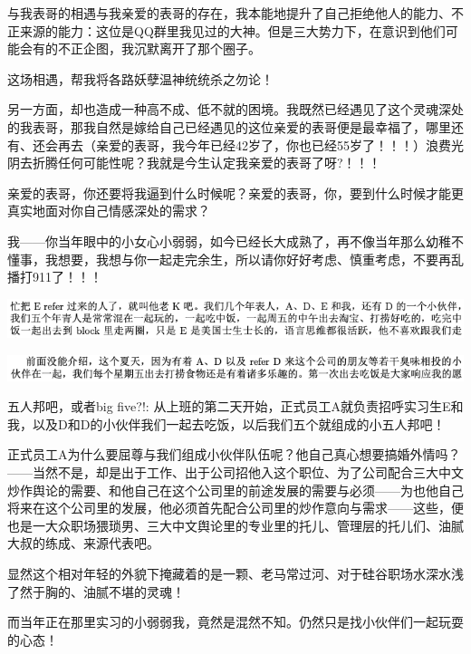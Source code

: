 \documentclass[9pt, b5paper]{article}
\begin{document}
与我表哥的相遇与我亲爱的表哥的存在，我本能地提升了自己拒绝他人的能力、不正来源的能力：这位是QQ群里我见过的大神。但是三大势力下，在意识到他们可能会有的不正企图，我沉默离开了那个圈子。 

这场相遇，帮我将各路妖孽温神统统杀之勿论！

另一方面，却也造成一种高不成、低不就的困境。我既然已经遇见了这个灵魂深处的我表哥，那我自然是嫁给自己已经遇见的这位亲爱的表哥便是最幸福了，哪里还有、还会再去（亲爱的表哥，我今年已经42岁了，你也已经55岁了！！！）浪费光阴去折腾任何可能性呢？我就是今生认定我亲爱的表哥了呀?！！！

亲爱的表哥，你还要将我逼到什么时候呢？亲爱的表哥，你，要到什么时候才能更真实地面对你自己情感深处的需求？

我——你当年眼中的小女心小弱弱，如今已经长大成熟了，再不像当年那么幼稚不懂事，我想要，我想与你一起走完余生，所以请你好好考虑、慎重考虑，不要再乱播打911了！！！

\begin{center}
\includegraphics[width=.9\linewidth]{./pic/backups_plans_20210507_212124.png}
\end{center}

\begin{center}
\includegraphics[width=.9\linewidth]{./pic/backups_plans_20210508_085823.png}
\end{center}

五人邦吧，或者big five?!: 从上班的第二天开始，正式员工A就负责招呼实习生E和我，以及D和D的小伙伴我们一起去吃饭，以后我们五个就组成的小五人邦吧！

正式员工A为什么要屈尊与我们组成小伙伴队伍呢？他自己真心想要搞婚外情吗？——当然不是，却是出于工作、出于公司招他入这个职位、为了公司配合三大中文炒作舆论的需要、和他自己在这个公司里的前途发展的需要与必须——为也他自己将来在这个公司里的发展，他必须首先配合公司里的炒作意向与需求——这些，便也是一大众职场猥琐男、三大中文舆论里的专业里的托儿、管理层的托儿们、油腻大叔的练成、来源代表吧。

显然这个相对年轻的外貌下掩藏着的是一颗、老马常过河、对于硅谷职场水深水浅了然于胸的、油腻不堪的灵魂！

而当年正在那里实习的小弱弱我，竟然是混然不知。仍然只是找小伙伴们一起玩耍的心态！
\end{document}
